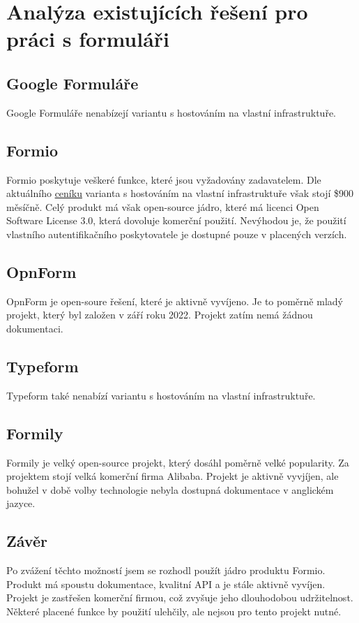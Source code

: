 
\chapter{Analýza existujících řešení pro práci s formuláři}

\section{Google Formuláře}

Google Formuláře nenabízejí variantu s hostováním na vlastní
infrastruktuře.

\section{Formio}

Formio poskytuje veškeré funkce, které jsou vyžadovány zadavatelem. Dle
aktuálního \href{https://form.io/pricing}{ceníku} varianta s hostováním na vlastní
infrastruktuře však stojí \$900 měsíčně. Celý produkt má však open-source
jádro, které má licenci Open Software License 3.0, která dovoluje komerční použití.
Nevýhodou je, že použití vlastního autentifikačního poskytovatele je dostupné
pouze v placených verzích.

\section{OpnForm}

OpnForm je open-soure řešení, které je aktivně vyvíjeno. Je to poměrně mladý
projekt, který byl založen v září roku 2022. Projekt zatím nemá žádnou dokumentaci.

\section{Typeform}

Typeform také nenabízí variantu s hostováním na vlastní infrastruktuře.

\section{Formily}

Formily je velký open-source projekt, který dosáhl poměrně velké popularity. Za
projektem stojí velká komerční firma Alibaba. Projekt je aktivně vyvjíjen, ale
bohužel v době volby technologie nebyla dostupná dokumentace v anglickém
jazyce.

\section{Závěr}

Po zvážení těchto možností jsem se rozhodl použít jádro produktu Formio.
Produkt má spoustu dokumentace, kvalitní API a je stále aktivně vyvíjen.
Projekt je zastřešen komerční firmou, což zvyšuje jeho dlouhodobou
udržitelnost. Některé placené funkce by použití ulehčily, ale nejsou pro tento
projekt nutné.
